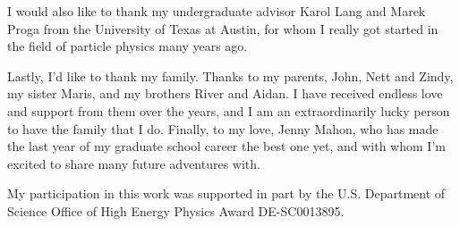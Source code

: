 I would also like to thank my undergraduate advisor Karol Lang and Marek Proga from the University of Texas at Austin, for whom I really got started in the field of particle physics many years ago.


Lastly, I'd like to thank my family. Thanks to my parents, John, Nett and Zindy, my sister Maris, and my brothers River and Aidan. I have received endless love and support from them over the years, and I am an extraordinarily lucky person to have the family that I do. Finally, to my love, Jenny Mahon, who has made the last year of my graduate school career the best one yet, and with whom I'm excited to share many future adventures with.


My participation in this work was supported in part by the U.S. Department of Science Office of High Energy Physics Award DE-SC0013895.

